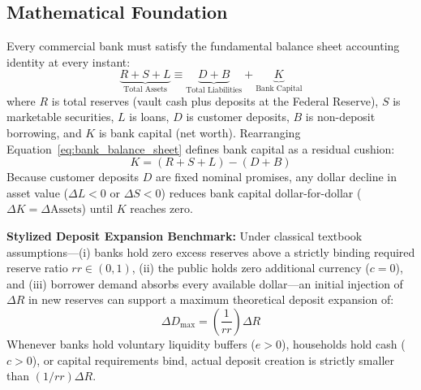 \documentclass[11pt, oneside]{book}
\begin{document}
\subsection*{Mathematical Foundation}

Every commercial bank must satisfy the fundamental balance sheet accounting identity at every instant:
\begin{equation}
  \underbrace{R + S + L}_{\text{Total Assets}} \equiv \underbrace{D + B}_{\text{Total Liabilities}} + \underbrace{K}_{\text{Bank Capital}}
  \label{eq:bank_balance_sheet}
\end{equation}
where $R$ is total reserves (vault cash plus deposits at the Federal Reserve), $S$ is marketable securities, $L$ is loans, $D$ is customer deposits, $B$ is non-deposit borrowing, and $K$ is bank capital (net worth). Rearranging Equation~\eqref{eq:bank_balance_sheet} defines bank capital as a residual cushion:
\begin{equation}
  K = (R + S + L) - (D + B)
  \label{eq:bank_capital}
\end{equation}
Because customer deposits $D$ are fixed nominal promises, any dollar decline in asset value ($\Delta L < 0$ or $\Delta S < 0$) reduces bank capital dollar-for-dollar ($\Delta K = \Delta \text{Assets}$) until $K$ reaches zero.

\textbf{Stylized Deposit Expansion Benchmark:} Under classical textbook assumptions—(i) banks hold zero excess reserves above a strictly binding required reserve ratio $rr \in (0, 1)$, (ii) the public holds zero additional currency ($c = 0$), and (iii) borrower demand absorbs every available dollar—an initial injection of $\Delta R$ in new reserves can support a maximum theoretical deposit expansion of:
\begin{equation}
  \Delta D_{\max} = \left(\frac{1}{rr}\right) \Delta R
  \label{eq:simple_multiplier}
\end{equation}
Whenever banks hold voluntary liquidity buffers ($e > 0$), households hold cash ($c > 0$), or capital requirements bind, actual deposit creation is strictly smaller than $(1/rr)\Delta R$.
\end{document}
